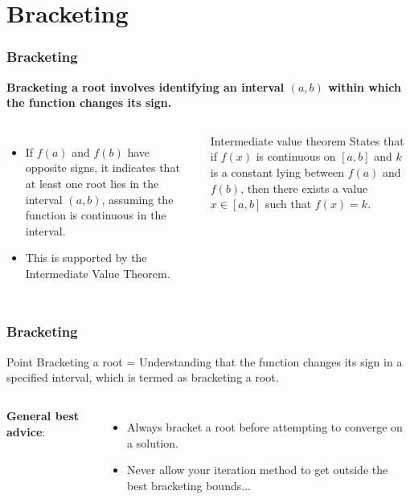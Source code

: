   \section{Bracketing}
  \begin{frame}[fragile]
    \frametitle{Bracketing}
    
    \textbf{Bracketing a root involves identifying an interval \((a, b)\) within which the function changes its sign.}
    \begin{columns}
      \vspace{0.25cm}
       
      \vspace{0.25cm}
        
    \begin{itemize}
      \item If \(f(a)\) and \(f(b)\) have opposite signs, it indicates that at least one root lies in the interval \((a, b)\), assuming the function is continuous in the interval.
      \item This is supported by the Intermediate Value Theorem.
    \end{itemize}
    \begin{block}{Intermediate value theorem}
      States that if \(f(x)\) is continuous on \([a, b]\) and \(k\) is a constant lying between \(f(a)\) and \(f(b)\), then there exists a value \(x \in [a, b]\) such that \(f(x) = k\).
    \end{block}
    \end{columns}
  
  \end{frame}

  \begin{frame}[fragile]
    \frametitle{Bracketing}

    \begin{block}{Point}
      Bracketing a root = Understanding that the function changes its sign in a specified interval, which is termed as bracketing a root.
    \end{block}

    \begin{columns}
    \vspace{0.25cm}
     
    
    \textbf{General best advice}:
        \begin{itemize}
          \item Always bracket a root before attempting to converge on a solution.
          \item Never allow your iteration method to get outside the best bracketing bounds...
        \end{itemize}
    \end{columns}
  \end{frame}
  
